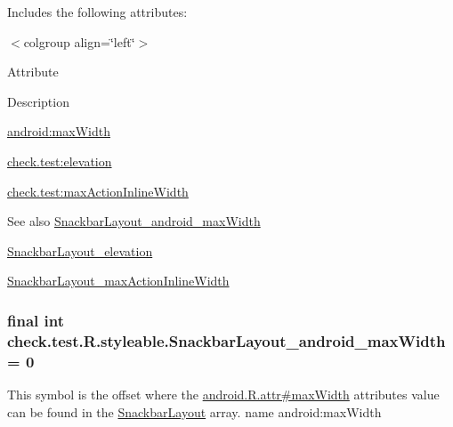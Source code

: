 Includes the following attributes\+:

\begin{TabularC}{0}
\hline
\end{TabularC}
$<$colgroup align=\char`\"{}left\char`\"{}$>$ 

Attribute

Description 

{\ttfamily \hyperlink{classcheck_1_1test_1_1_r_1_1styleable_a57a3c123cbfb81d22fa7a394c46add63}{android\+:max\+Width}}

{\ttfamily \hyperlink{classcheck_1_1test_1_1_r_1_1styleable_a803835166d359a018ca194cce78d142c}{check.\+test\+:elevation}}

{\ttfamily \hyperlink{classcheck_1_1test_1_1_r_1_1styleable_aa211406667d57a64a280c2c24e4a106d}{check.\+test\+:max\+Action\+Inline\+Width}}

\begin{DoxySeeAlso}{See also}
\hyperlink{classcheck_1_1test_1_1_r_1_1styleable_a57a3c123cbfb81d22fa7a394c46add63}{Snackbar\+Layout\+\_\+android\+\_\+max\+Width} 

\hyperlink{classcheck_1_1test_1_1_r_1_1styleable_a803835166d359a018ca194cce78d142c}{Snackbar\+Layout\+\_\+elevation} 

\hyperlink{classcheck_1_1test_1_1_r_1_1styleable_aa211406667d57a64a280c2c24e4a106d}{Snackbar\+Layout\+\_\+max\+Action\+Inline\+Width} 
\end{DoxySeeAlso}
\hypertarget{classcheck_1_1test_1_1_r_1_1styleable_a57a3c123cbfb81d22fa7a394c46add63}{}
\subsubsection[{Snackbar\+Layout\+\_\+android\+\_\+max\+Width}]{\setlength{\rightskip}{0pt plus 5cm}final int check.\+test.\+R.\+styleable.\+Snackbar\+Layout\+\_\+android\+\_\+max\+Width = 0\hspace{0.3cm}{\ttfamily [static]}}\label{classcheck_1_1test_1_1_r_1_1styleable_a57a3c123cbfb81d22fa7a394c46add63}
This symbol is the offset where the \hyperlink{}{android.\+R.\+attr\#max\+Width} attribute\textquotesingle{}s value can be found in the \hyperlink{classcheck_1_1test_1_1_r_1_1styleable_ad7fc8f60242ddfaa068c43f614e1ff65}{Snackbar\+Layout} array.  name android\+:max\+Width \hypertarget{classcheck_1_1test_1_1_r_1_1styleable_a803835166d359a018ca194cce78d142c}{}
